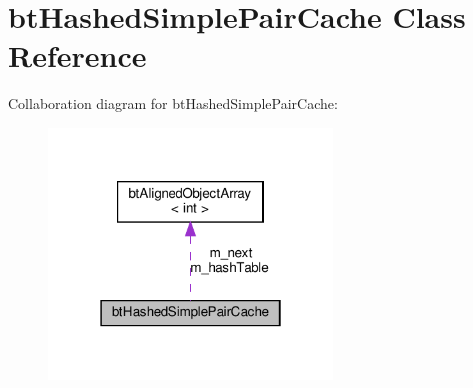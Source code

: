 \hypertarget{classbtHashedSimplePairCache}{}\section{bt\+Hashed\+Simple\+Pair\+Cache Class Reference}
\label{classbtHashedSimplePairCache}


Collaboration diagram for bt\+Hashed\+Simple\+Pair\+Cache\+:
\nopagebreak
\begin{figure}[H]
\begin{center}
\leavevmode
\includegraphics[width=214pt]{classbtHashedSimplePairCache__coll__graph}
\end{center}
\end{figure}
